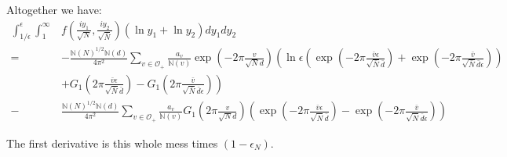 \documentclass{article}
\theoremstyle{plain}
\begin{document}
{Altogether we have:
\begin{align*}
\int_{1/\epsilon}^{\epsilon} \int_{1}^{\infty} & f\left(\frac{iy_1}{\sqrt{N}},\frac{iy_2}{\sqrt{\bar{N}}}\right) (\ln y_1+\ln y_2)dy_1 dy_2 \\
= &- \frac{\mathbb{N}(N)^{1/2}\mathbb{N}(d)}{4 \pi^2 }\sum_{v \in \mathcal{O}_+}  \frac{a_v}{\mathbb{N}(v)}  \exp\left( -2\pi \frac{v}{\sqrt{N} d}\right) \left( \ln \epsilon \left( \exp \left( -2\pi \frac{\bar{v} \epsilon}{\sqrt{\bar{N}}\bar{d}}\right) +  \exp \left( -2\pi \frac{\bar{v} }{\sqrt{\bar{N}}\bar{d}\epsilon}\right) \right) \right. \\
& + \left. G_1\left(2\pi \frac{\bar{v} \epsilon}{\sqrt{\bar{N}}\bar{d}}\right)-G_1\left( 2\pi \frac{\bar{v} }{\sqrt{\bar{N}}\bar{d}\epsilon}\right) \right) \\
- & \frac{\mathbb{N}(N)^{1/2}\mathbb{N}(d)}{4 \pi^2 } \sum_{v \in \mathcal{O}_+} \frac{a_v}{\mathbb{N}(v)}  G_1\left( 2\pi \frac{v}{\sqrt{N} d}\right) \left( \exp \left( -2\pi \frac{\bar{v} \epsilon}{\sqrt{\bar{N}}\bar{d}}\right) -  \exp \left( -2\pi \frac{\bar{v} }{\sqrt{\bar{N}}\bar{d}\epsilon}\right)\right)
\end{align*}

The first derivative is this whole mess times $(1 - \epsilon_N)$.

}
\end{document}
